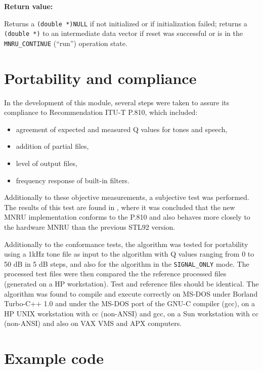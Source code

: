 {\bf Return value: }

Returns a {\tt (double *)NULL} if not initialized or if initialization
failed; returns a {\tt (double *)} to an intermediate data vector if reset
was successful or is in the {\tt MNRU\_CONTINUE} (``run'') operation
state.


\section{Portability and compliance} \label{MNRU-Tests}

In the development of this module, several steps were taken to assure
its compliance to Recommendation ITU-T P.810, which included:

\begin{itemize}
  \item agreement of expected and measured Q values for tones and
        speech,
  \item addition of partial files,
  \item level of output files,
  \item frequency response of built-in filters.
\end{itemize}

Additionally to these objective measurements, a subjective test was
performed. The results of this test are found in \cite{Duo-MNRU},
where it was concluded that the new MNRU implementation conforms to
the P.810 and also behaves more closely to the hardware MNRU
than the previous STL92 version.

Additionally to the conformance tests, the algorithm was tested for
portability using a 1kHz tone file as input to the algorithm with Q
values ranging from 0 to 50 dB in 5 dB steps, and also for the
algorithm in the {\tt SIGNAL\_ONLY} mode. The processed test files were
then compared the the reference processed files (generated on a HP
workstation). Test and reference files should be identical.
The algorithm was found to compile and execute correctly on MS-DOS
under Borland Turbo-C++ 1.0 and under the MS-DOS port of the GNU-C
compiler (gcc), on a HP UNIX workstation with cc (non-ANSI) and gcc,
on a Sun workstation with cc (non-ANSI) and also on VAX VMS and APX
computers.


\section{Example code}

